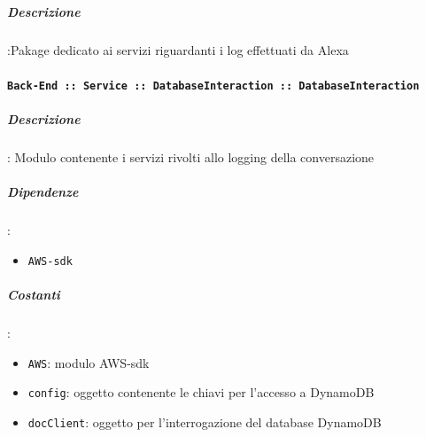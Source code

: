 \documentclass[../DefinizioneDiProdotto_v2.0.0.tex]{subfiles}
\begin{document}
\subparagraph{Descrizione}:Pakage dedicato ai servizi riguardanti i log effettuati da Alexa

\paragraph{\texttt{Back-End :: Service :: DatabaseInteraction :: DatabaseInteraction}}
\subparagraph{Descrizione}: Modulo contenente i servizi rivolti allo logging della conversazione
\subparagraph{Dipendenze}:
\begin{itemize}
	\item \texttt{AWS-sdk}
\end{itemize}
\subparagraph{Costanti}:
\begin{itemize}
	\item \texttt{AWS}: modulo AWS-sdk
	\item \texttt{config}: oggetto contenente le chiavi per l'accesso a DynamoDB
	\item \texttt{docClient}: oggetto per l'interrogazione del database DynamoDB
\end{itemize}
\end{document}

